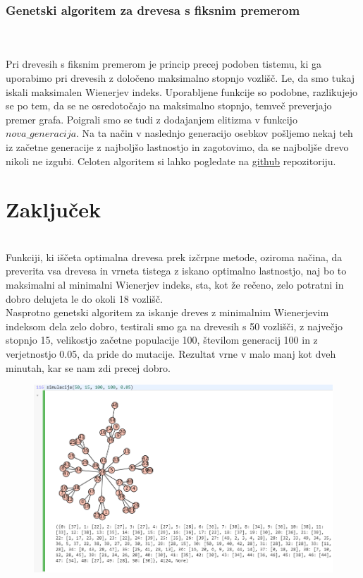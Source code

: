 \documentclass[12pt,a4paper]{amsart}
\theoremstyle{definition} %
\theoremstyle{plain} %
\begin{document}
\subsubsection{Genetski algoritem za drevesa s fiksnim premerom}
\
\\
\\
Pri drevesih s fiksnim premerom je princip precej podoben tistemu, ki ga uporabimo pri drevesih z določeno maksimalno stopnjo vozlišč. Le, da smo tukaj iskali maksimalen Wienerjev indeks.
Uporabljene funkcije so podobne, razlikujejo se po tem, da se ne osredotočajo na maksimalno stopnjo, temveč preverjajo premer grafa. 
Poigrali smo se tudi z dodajanjem elitizma v funkcijo $nova\_generacija$. Na ta način v naslednjo generacijo osebkov pošljemo nekaj teh iz začetne generacije 
z najboljšo lastnostjo in zagotovimo, da se najboljše drevo nikoli ne izgubi. Celoten algoritem si lahko pogledate na \href{https://github.com/HovnikK15/Prescribed-trees-with-max-min-Wiener-index/blob/master/Genetic%20algorithm%20for%20max%20Wiener%20index.sagews}{github} repozitoriju.
\newpage
\section{Zaključek}
\
\\
Funkciji, ki iščeta optimalna drevesa prek izčrpne metode, oziroma načina, da preverita vsa drevesa in vrneta tistega
z iskano optimalno lastnostjo, naj bo to maksimalni al minimalni Wienerjev indeks, sta, kot že rečeno, zelo potratni in dobro
delujeta le do okoli 18 vozlišč. 
\\
Nasprotno genetski algoritem za iskanje dreves z minimalnim Wienerjevim indeksom dela zelo dobro, testirali smo ga na drevesih s 50 vozlišči,
z največjo stopnjo 15, velikostjo začetne populacije 100, številom generacij 100 in z verjetnostjo 0.05, da pride do mutacije. Rezultat vrne v malo manj kot dveh minutah, kar se nam zdi precej dobro.
\begin{figure}[ht]
\centering
\includegraphics[width=1\textwidth]{slika7}
\end{figure}
\end{document}
